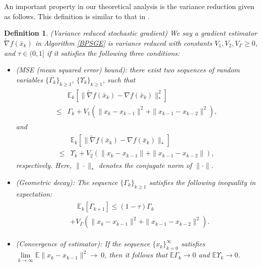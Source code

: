 \documentclass[letterpaper]{article} %
\newtheorem{definition}{Definition}
\begin{document}
	An important property in our theoretical analysis is  the variance reduction  given as follows.
	This definition is similar to that in  \cite{ DriggsTLDS2020, WangH23}.
	\begin{definition}\label{vr_definition} (Variance reduced stochastic gradient)
		We say a gradient estimator  $\tilde{\nabla}f(\bar{x}_{k})$ in Algorithm \ref{BPSGE} is variance reduced with constants $V_{1}, V_{2},V_{\Gamma}\ge 0$, and $\tau\in(0,1]$ if it satisfies the following three conditions:
		\begin{itemize}
			\item (MSE (mean squared error) bound): there exist two sequences of random variables $\{\Gamma_{k}\}_{k\ge1}$,  $\{\Upsilon_{k}\}_{k\ge1}$,  such that
			\begin{eqnarray}
				\begin{aligned}
					&\mathbb{E}_{k}[\|\tilde{\nabla}f(\bar{x}_{k})-\nabla f(\bar{x}_{k})\|_{*}^{2}]\\
					\le& \Gamma_{k}+ V_{1}\left(\|x_{k}-x_{k-1}\|^{2}+\|x_{k-1}-x_{k-2}\|^{2}\right),
				\end{aligned}\label{MSE_l22}
			\end{eqnarray}
			and
			\begin{eqnarray}
				\begin{aligned}
					&\mathbb{E}_{k}[\|\tilde{\nabla}f(\bar{x}_{k})-\nabla f(\bar{x}_{k})\|_{*}]\\
					\le&\Upsilon_{k}+ V_{2}\left(\|x_{k}-x_{k-1}\|+\|x_{k-1}-x_{k-2}\|\right),
				\end{aligned}\label{MSE_l2}
			\end{eqnarray}
			respectively. Here, $\|\cdot\|_{*}$ denotes the conjugate norm \cite{Rockafellar1970} of $\|\cdot\|$.
			\item (Geometric decay):
			The sequence $\{\Gamma_{k}\}_{k\ge1}$ satisfies the following inequality in expectation:
			\begin{eqnarray}
				\begin{aligned}
					&\quad \mathbb{E}_{k}[\Gamma_{k+1}]\le (1-\tau)\Gamma_{k}\\&+V_{\Gamma}\left(\|x_{k}-x_{k-1}\|^{2}+\|x_{k-1}-x_{k-2}\|^{2}\right).\label{Gamma_k1_k}
				\end{aligned}
			\end{eqnarray}
			\item (Convergence of estimator):
			If the sequence  $\{x_{k}\}_{k=0}^{\infty}$ satisfies $\lim\limits_{k\rightarrow\infty}\mathbb{E}\|x_{k}-x_{k-1}\|^{2}\rightarrow~0$, then it follows that $\mathbb{E}\Gamma_{k}\rightarrow0$ and $\mathbb{E}\Upsilon_{k}\rightarrow0$.
		\end{itemize}
	\end{definition}
\end{document}

